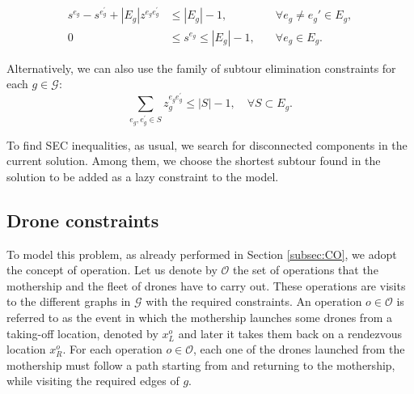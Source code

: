 \begin{align}
    s^{e_g} - s^{e^\prime_g} + |E_g|z^{e_ge^\prime_g} & \leq |E_g| - 1  , &\quad\forall e_g \neq e_g'\in E_g, \tag{MTZ$_1$} \label{NOMTZ1}\\
    0 & \leq s^{e_g} \leq |E_g| - 1, &\quad\forall e_g\in E_g.\tag{MTZ$_2$}\label{NOMTZ2}
\end{align}

\noindent
Alternatively, we can also use the family of subtour elimination constraints for each $g\in\mathcal G$:
\begin{equation}\tag{SEC}\label{NOSEC}
    \sum_{e_g, e^\prime_g \in S} z_g^{e_ge^\prime_g} \leq |S| - 1, \quad \forall S\subset E_g.
\end{equation}

\noindent
To find SEC inequalities, as usual, we search for disconnected components in the current solution. Among them, we choose the shortest subtour found in the solution to be added as a lazy constraint to the model.\\

\subsection*{Drone constraints}
\noindent
To model this problem, as already performed in Section \ref{subsec:CO}, we adopt the concept of operation.
Let us denote by $\mathcal O$ the set of operations that the mothership and the fleet of drones have to carry out. These operations are visits to the different graphs in $\mathcal G$ with the required constraints. An operation $o\in\mathcal O$ is referred to as the event in which the mothership launches some drones from a taking-off location, denoted by $x_L^o$ and later it takes them back on a rendezvous location $x_R^o$. 
\noindent
For each operation $o\in\mathcal O$, each one of the drones launched from the mothership must follow a path starting from and returning to the mothership, while visiting the required edges of $g$.



